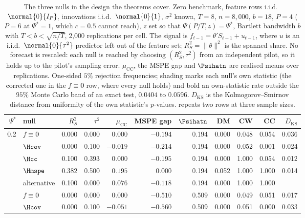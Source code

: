\begin{table}[htbp]
\centering
\caption{The three nulls in the design the theorems cover. Zero benchmark, feature rows i.i.d.\ $\normal{0}{I_P}$, innovations i.i.d.\ $\normal{0}{1}$, $\sigma^2$ known, $T=8$, $n=8{,}000$, $b=18$, $P=4$ ($P=6$ at $\Psi^*=1$, which $c=0.5$ cannot reach), $z$ set so that $\Psi(P/T,z)=\Psi^*$, Bartlett bandwidth $b$ with $T<b<\sqrt{n/T}$, 2{,}000 replications per cell. The signal is $f_{t-1}=\theta'S_{t-1}+u_{t-1}$, where $u$ is an i.i.d.\ $\normal{0}{\tau^2}$ predictor left out of the feature set; $R^2_S=\|\theta\|^2$ is the spanned share. No forecast is rescaled: each null is reached by choosing $(R^2_S,\tau^2)$ from an independent pilot, so it holds up to the pilot's sampling error. $\mu_{\mathrm{CC}}$, the MSPE gap and $\Psihatn$ are realised means over replications. One-sided $5\%$ rejection frequencies; shading marks each null's own statistic (the corrected one in the $f\equiv0$ row, where every null holds) and bold an own-statistic rate outside the $95\%$ Monte Carlo band of an exact test, $0.0404$ to $0.0596$. $D_{\mathrm{KS}}$ is the Kolmogorov--Smirnov distance from uniformity of the own statistic's $p$-values.  repeats two rows at three sample sizes.}
\label{tab:mc-conform}
\small
\setlength{\tabcolsep}{4pt}
\begin{tabular}{rlrrrrrrrrr}
\toprule
$\Psi^*$ & null & $R^2_S$ & $\tau^2$ & $\mu_{\mathrm{CC}}$ & MSPE gap & $\Psihatn$ & DM & CW & CC & $D_{\mathrm{KS}}$ \\
\midrule
0.2 & $f\equiv0$ & 0.000 & 0.000 & $0.000$ & $-0.194$ & 0.194 & 0.000 & 0.048 & \cellcolor{black!10}0.054 & 0.036 \\
 & $\Hcov$ & 0.000 & 0.100 & $-0.019$ & $-0.214$ & 0.194 & 0.000 & \cellcolor{black!10}0.052 & 0.001 & 0.024 \\
 & $\Hcc$ & 0.100 & 0.393 & $0.000$ & $-0.195$ & 0.194 & 0.000 & 1.000 & \cellcolor{black!10}0.054 & 0.012 \\
 & $\Hmspe$ & 0.382 & 0.500 & $0.195$ & $0.000$ & 0.194 & \cellcolor{black!10}0.052 & 1.000 & 1.000 & 0.014 \\
 & alternative & 0.100 & 0.000 & $0.076$ & $-0.118$ & 0.194 & 0.000 & 1.000 & 1.000 &  \\
\addlinespace
0.5 & $f\equiv0$ & 0.000 & 0.000 & $0.000$ & $-0.510$ & 0.509 & 0.000 & 0.049 & \cellcolor{black!10}0.051 & 0.017 \\
 & $\Hcov$ & 0.000 & 0.100 & $-0.051$ & $-0.560$ & 0.509 & 0.000 & \cellcolor{black!10}0.051 & 0.000 & 0.033 \\

\end{tabular}
\end{table}
